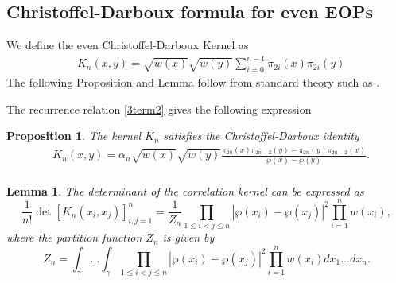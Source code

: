 \documentclass[11pt,a4paper]{article}
\newtheorem{lemma}[theorem]{Lemma}
\newtheorem{proposition}[theorem]{Proposition}
\theoremstyle{definition}
\numberwithin{equation}{section}
\numberwithin{theorem}{section}
\begin{document}
\subsection{Christoffel-Darboux formula for even EOPs}\label{subsec:CD-even}


We define the even Christoffel-Darboux Kernel as 
\begin{align}
&{K_{n}}(x,y)=\sqrt{w(x)}\sqrt{w(y)}\sum_{i=0}^{n-1}\pi_{2i}(x)\pi_{2i}(y)
\end{align}
The following Proposition and Lemma follow from standard theory such as \cite{forrester2010log}.


    The recurrence relation \eqref{3term2} gives the following expression
\begin{proposition}
    The kernel ${K_n}$ satisfies the Christoffel-Darboux identity
\begin{align}
    &K_{n}(x,y)=\alpha_n \sqrt{w(x)}\sqrt{w (y)}\frac{\pi_{2n}(x)\pi_{2n-2}(y)-\pi_{2n}(y)\pi_{2n-2}(x)}{\wp(x)-\wp(y)}.\\&
\end{align}
\end{proposition}

\begin{lemma}
    The determinant of the correlation kernel can be expressed as 
    \begin{equation}
          \frac{1}{n!}\det [K_n(x_i,x_j)]_{i,j=1}^{n}=\frac{1}{Z_{n}}\prod_{1\leq i<j\leq n}|\wp(x_{i})-\wp(x_{j})|^{2}\prod_{i=1}^{n}w(x_{i}),
    \end{equation}
    where the partition function $Z_n$ is given by 
    \begin{equation}
        Z_{n}=\int_{\gamma}\dots\int_{\gamma}\prod_{1\leq i<j\leq n}|\wp(x_{i})-\wp(x_{j})|^{2}\prod_{i=1}^{n}w(x_{i})dx_{1}\dots dx_{n}.
    \end{equation}
\end{lemma}
\end{document}
